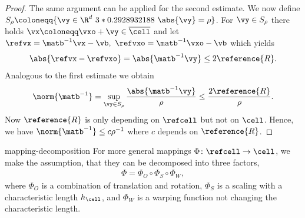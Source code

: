 \begin{proof}
  The same argument can be applied for the second estimate.
  We now define $S_\rho\coloneqq \{\vy\in\R^d~\mid~\abs{\vy}=\rho \}$.
  For $\vy\in S_\rho$ there holds $\vx\coloneqq\vxo+\vy\in\overline{\cell}$
  and let $\refvx=\matb^{-1}\vx-\vb,~\refvxo=\matb^{-1} \vxo - \vb$ which yields
  \begin{align*}
    \abs{\refvx - \refvxo} = \abs{\matb^{-1} \vy}\leq 2\reference{R}.
  \end{align*}
  Analogous to the first estimate we obtain
  \begin{align*}
    \norm{\matb^{-1}} = \sup_{\vy\in S_\rho} \frac{\abs{\matb^{-1} \vy}}{\rho}
    \leq \frac{2\reference{R}}{\rho}.
  \end{align*}
  Now $\reference{R}$ is only depending on $\refcell$ but not on $\cell$.
  Hence, we have $\norm{\matb^{-1}}\leq c\rho^{-1}$ where $c$ depends
  on $\reference{R}$.
\end{proof}

\begin{Assumption}{mapping-decomposition}
  For more general mappings $\Phi\colon \refcell\to \cell$, we
  make the assumption, that they can be decomposed into three factors,
  \begin{gather}
    \Phi = \Phi_O \circ \Phi_S \circ \Phi_W,
  \end{gather}
  where $\Phi_O$ is a combination of translation and rotation,
  $\Phi_S$ is a scaling with a characteristic length $h_{\cell}$, and
  $\Phi_W$ is a warping function not changing the characteristic length.
\end{Assumption}

